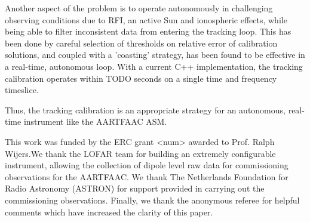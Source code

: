 \documentclass{aa}
\begin{document}
Another  aspect  of  the  problem  is to  operate  autonomously  in  challenging
observing conditions  due to RFI, an  active Sun and  ionospheric effects, while
being able to filter inconsistent data from entering the tracking loop. This has
been done  by careful selection of  thresholds on relative  error of calibration
solutions,  and  coupled  with a  'coasting'  strategy,  has  been found  to  be
effective in  a real-time, autonomous  loop. With a current  C++ implementation,
the  tracking calibration  operates within  TODO seconds  on a  single  time and
frequency timeslice.

Thus, the  tracking calibration  is an appropriate  strategy for  an autonomous,
real-time instrument like the AARTFAAC ASM.


\begin {acknowledgements}

This work  was funded by  the ERC grant  <num> awarded to Prof.  Ralph Wijers.We
thank the LOFAR team for building an extremely configurable instrument, allowing
the collection of  dipole level raw data for  commissioning observations for the
AARTFAAC. We thank  The Netherlands Foundation for Radio  Astronomy (ASTRON) for
support  provided in carrying  out the  commissioning observations.  Finally, we
thank  the anonymous  referee  for  helpful comments  which  have increased  the
clarity of this paper.
\end{acknowledgements}


\end{document}

